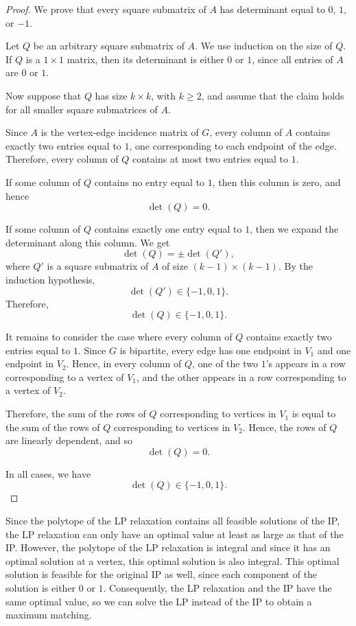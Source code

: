 \documentclass[12pt]{report}
\numberwithin{algorithm}{chapter}
\begin{document}
	\begin{proof}
		We prove that every square submatrix of $A$ has determinant equal to $0$, $1$, or $-1$.
		
		Let $Q$ be an arbitrary square submatrix of $A$. We use induction on the size of $Q$. If $Q$ is a $1 \times 1$ matrix, then its determinant is either $0$ or $1$, since all entries of $A$ are $0$ or $1$.
		
		Now suppose that $Q$ has size $k \times k$, with $k \geq 2$, and assume that the claim holds for all smaller square submatrices of $A$.
		
		Since $A$ is the vertex-edge incidence matrix of $G$, every column of $A$ contains exactly two entries equal to $1$, one corresponding to each endpoint of the edge. Therefore, every column of $Q$ contains at most two entries equal to $1$.
		
		If some column of $Q$ contains no entry equal to $1$, then this column is zero, and hence
		\[
		\det(Q)=0.
		\]
		
		If some column of $Q$ contains exactly one entry equal to $1$, then we expand the determinant along this column. We get
		\[
		\det(Q)=\pm \det(Q'),
		\]
		where $Q'$ is a square submatrix of $A$ of size $(k-1)\times(k-1)$. By the induction hypothesis,
		\[
		\det(Q')\in\{-1,0,1\}.
		\]
		Therefore,
		\[
		\det(Q)\in\{-1,0,1\}.
		\]	
		
		It remains to consider the case where every column of $Q$ contains exactly two entries equal to $1$. Since $G$ is bipartite, every edge has one endpoint in $V_1$ and one endpoint in $V_2$. Hence, in every column of $Q$, one of the two $1$'s appears in a row corresponding to a vertex of $V_1$, and the other appears in a row corresponding to a vertex of $V_2$.
		
		Therefore, the sum of the rows of $Q$ corresponding to vertices in $V_1$ is equal to the sum of the rows of $Q$ corresponding to vertices in $V_2$. Hence, the rows of $Q$ are linearly dependent, and so
		\[
		\det(Q)=0.
		\]		
		
		In all cases, we have
		\[
		\det(Q)\in\{-1,0,1\}.
		\]
	\end{proof}
	
	Since the polytope of the LP relaxation contains all feasible solutions of the IP, the LP relaxation can only have an optimal value at least as large as that of the IP. However, the polytope of the LP relaxation is integral and since it has an optimal solution at a vertex, this optimal solution is also integral. This optimal solution is feasible for the original IP as well, since each component of the solution is either $0$ or $1$. Consequently, the LP relaxation and the IP have the same optimal value, so we can solve the LP instead of the IP to obtain a maximum matching.
	
\end{document}

